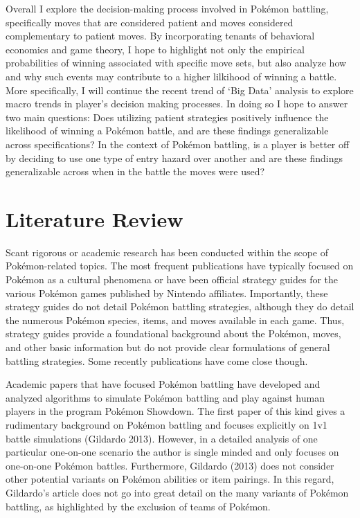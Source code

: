\documentclass[12pt,twoside]{reedthesis}
\begin{document}
  Overall I explore the decision-making process involved in Pokémon
  battling, specifically moves that are considered patient and moves
  considered complementary to patient moves. By incorporating tenants of
  behavioral economics and game theory, I hope to highlight not only the
  empirical probabilities of winning associated with specific move sets,
  but also analyze how and why such events may contribute to a higher
  lilkihood of winning a battle. More specifically, I will continue the
  recent trend of `Big Data' analysis to explore macro trends in player's
  decision making processes. In doing so I hope to answer two main
  questions: Does utilizing patient strategies positively influence the
  likelihood of winning a Pokémon battle, and are these findings
  generalizable across specifications? In the context of Pokémon battling,
  is a player is better off by deciding to use one type of entry hazard
  over another and are these findings generalizable across when in the
  battle the moves were used?
  
  \section{Literature Review}\label{literature-review}
  
  Scant rigorous or academic research has been conducted within the scope
  of Pokémon-related topics. The most frequent publications have typically
  focused on Pokémon as a cultural phenomena or have been official
  strategy guides for the various Pokémon games published by Nintendo
  affiliates. Importantly, these strategy guides do not detail Pokémon
  battling strategies, although they do detail the numerous Pokémon
  species, items, and moves available in each game. Thus, strategy guides
  provide a foundational background about the Pokémon, moves, and other
  basic information but do not provide clear formulations of general
  battling strategies. Some recently publications have come close though.
  
  Academic papers that have focused Pokémon battling have developed and
  analyzed algorithms to simulate Pokémon battling and play against human
  players in the program Pokémon Showdown. The first paper of this kind
  gives a rudimentary background on Pokémon battling and focuses
  explicitly on 1v1 battle simulations (Gildardo 2013). However, in a
  detailed analysis of one particular one-on-one scenario the author is
  single minded and only focuses on one-on-one Pokémon battles.
  Furthermore, Gildardo (2013) does not consider other potential variants
  on Pokémon abilities or item pairings. In this regard, Gildardo's
  article does not go into great detail on the many variants of Pokémon
  battling, as highlighted by the exclusion of teams of Pokémon.
  
\end{document}
